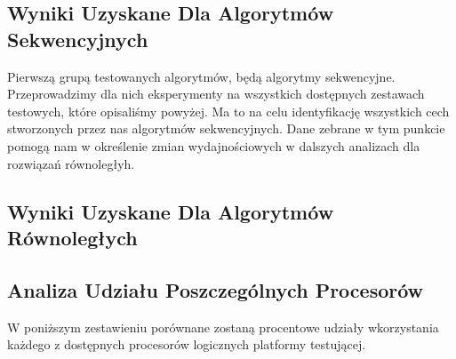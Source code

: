 \documentclass{article}
\begin{document}
        \subsection{Wyniki Uzyskane Dla Algorytmów Sekwencyjnych}
            Pierwszą grupą testowanych algorytmów, będą algorytmy sekwencyjne. Przeprowadzimy dla nich eksperymenty na wszystkich dostępnych zestawach testowych, które opisaliśmy powyżej. Ma to na celu identyfikację wszystkich cech stworzonych przez nas algorytmów sekwencyjnych. Dane zebrane w tym punkcie pomogą nam w określenie zmian wydajnościowych w dalszych analizach dla rozwiązań równoległyh.
            
            
        \subsection{Wyniki Uzyskane Dla Algorytmów Równoległych}
            
        \subsection{Analiza Udziału Poszczególnych Procesorów}
            W poniższym zestawieniu porównane zostaną procentowe udziały wkorzystania każdego z dostępnych procesorów logicznych platformy testującej.
            
\end{document}
